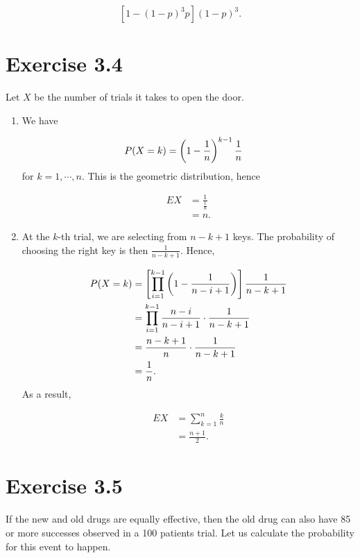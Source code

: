 \documentclass[12pt,letterpaper,reqno]{amsart}
\numberwithin{equation}{subsection}
\begin{document}
 \[ \left[ 1-(1-p)^3p \right] (1-p)^3. \]
 
 \newpage
 \section{Exercise 3.4}
 
 Let $X$ be the number of trials it takes to open the door.
 
 \begin{enumerate}[label=(\alph*),leftmargin=*]
     \item We have
     
     \begin{align*}
         {P}\! \left( {X = k} \right) &= \left( 1 - \frac{1}{n} \right)^{k-1} \frac{1}{n}
     \end{align*}
     for $k = 1, \cdots, n$. This is the geometric distribution, hence
     
     \begin{align*}
         EX &= \frac{1}{\frac{1}{n}} \\
            &= n.
     \end{align*}
     
     \item At the $k$-th trial, we are selecting from $n-k+1$ keys. The probability of choosing the right key is then $\frac{1}{n-k+1}$. Hence,
     
     \begin{align*}
         {P}\! \left( {X=k} \right) &=  \left[ \prod_{i=1}^{k-1} \left( 1 - \frac{1}{n-i+1} \right) \right] \frac{1}{n-k+1} \\
         &= \prod_{i=1}^{k-1} \frac{n-i}{n-i+1} \cdot \frac{1}{n-k+1} \\
         &= \frac{n-k+1}{n} \cdot \frac{1}{n-k+1} \\
         &= \frac{1}{n}.
     \end{align*}
     As a result,
     
     \begin{align*}
         EX &= \sum_{k=1}^n \frac{k}{n} \\
            &= \frac{n+1}{2}.
     \end{align*}
 \end{enumerate}

\newpage
\section{Exercise 3.5}

If the new and old drugs are equally effective, then the old drug can also have 85 or more successes observed in a 100 patients trial. Let us calculate the probability for this event to happen.
\end{document}
